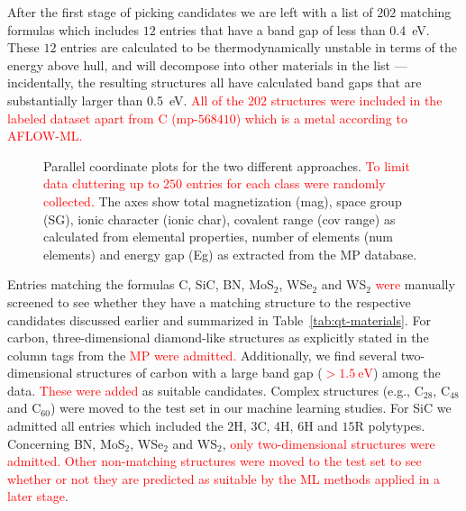\documentclass[superscriptaddress,unsortedaddress,
 amsmath,amssymb,
 aps,
]{revtex4-2}
\newcommand{\mrk}[1]{\textcolor{red}{#1}}
\begin{document}
After the first stage of picking candidates we are left with a list of $202$ matching formulas which includes $12$ entries that have a band gap of less than \SI{0.4}{\electronvolt}.
These $12$ entries are calculated to be thermodynamically unstable in terms of the energy above hull, and will decompose into other materials in the list --- incidentally, the resulting structures all have calculated band gaps that are substantially larger than \SI{0.5}{\electronvolt}.
\mrk{All of the $202$ structures were included in the labeled dataset apart from C (mp-$568410$) which is a metal according to AFLOW-ML. }
 
\begin{figure}[t] %
    \centering
    \begin{subfigure}{1\textwidth}
        \centering
        \scalebox{0.85}{}
    \end{subfigure}
    \begin{subfigure}{1\textwidth}
        \centering
          \scalebox{0.85}{}
    \end{subfigure}
    \caption{Parallel coordinate plots for the two different approaches. \mrk{To limit data cluttering up to $250$ entries for each class were randomly collected.}  
    The axes show total magnetization (mag), space group (SG), ionic character (ionic char), covalent range (cov range) as calculated from elemental properties, number of elements (num elements) and energy gap (Eg) as extracted from the MP database.} 
    \label{fig:parallel-coordinates-approaches}
\end{figure}

Entries matching the formulas C, SiC, BN, MoS$_2$, WSe$_2$ and WS$_2$ \mrk{were} manually screened to see whether they have a matching structure to the respective candidates discussed earlier and summarized in Table~\ref{tab:qt-materials}. 
For carbon, three-dimensional diamond-like structures as explicitly stated in the column tags from the \mrk{MP} \mrk{were admitted.} Additionally, we find several two-dimensional structures of carbon with a large band gap (\mrk{$>\SI{1.5}{\electronvolt}$}) among the data. \mrk{These were added} as suitable candidates. Complex structures (e.g., C$_{28}$, C$_{48}$ and C$_{60}$) were moved to the test set in our machine learning studies. For SiC we admitted all entries which included the $2$H, $3$C, $4$H, $6$H and $15$R polytypes. Concerning BN, MoS$_2$, WSe$_2$ and WS$_2$, \mrk{only two-dimensional structures were admitted. 
Other non-matching structures were moved to the test set to see whether or not they are predicted as suitable by the ML methods applied in a later stage}.
\end{document}
